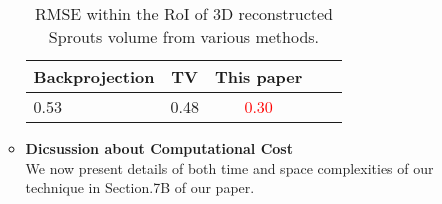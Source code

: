 \documentclass{article}
\begin{document}
\begin{itemize}
\begin{itemize}
\begin{table}[!h]
  \centering
 \caption{RMSE within the RoI of 3D reconstructed Sprouts volume from various
    methods.}
\begin{tabular}{|l|c|c|c|c|}
\hline 
\textbf{Backprojection} & \textbf{TV} & \textbf{This paper}
\\ \hline  0.53 & 0.48 & \textcolor{red}{0.30}
\\ \hline
\end{tabular}
\label{table:sprouts_rmse}
\end{table}


\item \textbf{Dicsussion about Computational Cost}\\
  We now present details of both time and space complexities of our technique in Section.7B of our paper.
\end{itemize}
  
  
\end{itemize}
\end{document}
